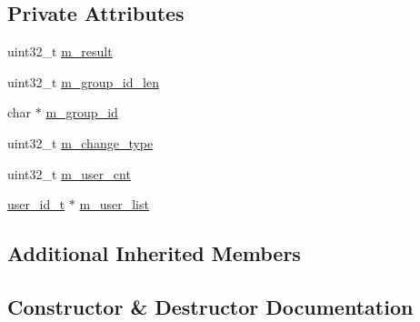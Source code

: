 \subsection*{Private Attributes}
\begin{DoxyCompactItemize}
\item 
uint32\+\_\+t \hyperlink{class_c_im_pdu_client_group_change_member_response_aa5bb03802146fb0f2485032a85cb4122}{m\+\_\+result}
\item 
uint32\+\_\+t \hyperlink{class_c_im_pdu_client_group_change_member_response_ab8ba68ce535b5d90b2dc435ec038e89d}{m\+\_\+group\+\_\+id\+\_\+len}
\item 
char $\ast$ \hyperlink{class_c_im_pdu_client_group_change_member_response_ab9aef53e368653206d3a88c92962db6d}{m\+\_\+group\+\_\+id}
\item 
uint32\+\_\+t \hyperlink{class_c_im_pdu_client_group_change_member_response_a1cb13b57d3e5d70cf21fe8ee08361770}{m\+\_\+change\+\_\+type}
\item 
uint32\+\_\+t \hyperlink{class_c_im_pdu_client_group_change_member_response_a348f58a38f785cf7d7a24f34fbba78e6}{m\+\_\+user\+\_\+cnt}
\item 
\hyperlink{structuser__id__t}{user\+\_\+id\+\_\+t} $\ast$ \hyperlink{class_c_im_pdu_client_group_change_member_response_ad848ce1ef9fceb547fd43fff7181af67}{m\+\_\+user\+\_\+list}
\end{DoxyCompactItemize}
\subsection*{Additional Inherited Members}


\subsection{Constructor \& Destructor Documentation}
\hypertarget{class_c_im_pdu_client_group_change_member_response_af316ced7dec6c6bb8335004de31337c5}{}
